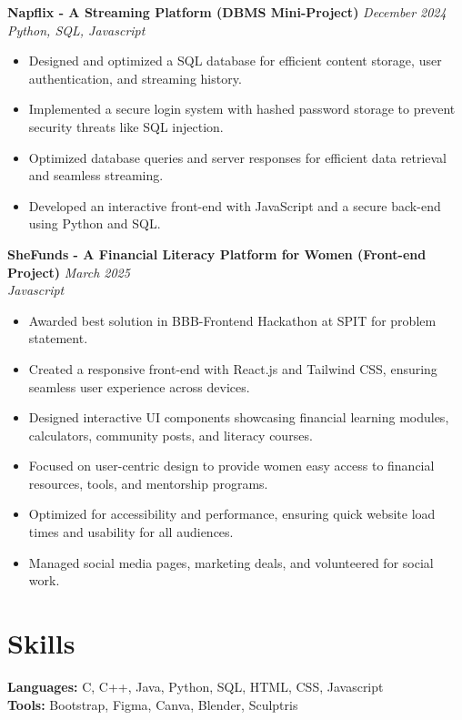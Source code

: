 \documentclass{article}
\begin{document}
\textbf{Napflix - A Streaming Platform (DBMS Mini-Project)} \hfill \textit{December 2024} \\
\textit{Python, SQL, Javascript} \\
\begin{itemize}
    \item Designed and optimized a SQL database for efficient content storage, user authentication, and streaming history.
    \item Implemented a secure login system with hashed password storage to prevent security threats like SQL injection.
    \item Optimized database queries and server responses for efficient data retrieval and seamless streaming.
    \item Developed an interactive front-end with JavaScript and a secure back-end using Python and SQL.
\end{itemize}

\textbf{SheFunds - A Financial Literacy Platform for Women (Front-end Project)} \hfill \textit{March 2025} \\
\textit{Javascript} \\
\begin{itemize}
    \item Awarded best solution in BBB-Frontend Hackathon at SPIT for problem statement.
    \item Created a responsive front-end with React.js and Tailwind CSS, ensuring seamless user experience across devices.
    \item Designed interactive UI components showcasing financial learning modules, calculators, community posts, and literacy courses.
    \item Focused on user-centric design to provide women easy access to financial resources, tools, and mentorship programs.
    \item Optimized for accessibility and performance, ensuring quick website load times and usability for all audiences.
    \item Managed social media pages, marketing deals, and volunteered for social work.
\end{itemize}

\section*{Skills}
\textbf{Languages:} C, C++, Java, Python, SQL, HTML, CSS, Javascript \\
\textbf{Tools:} Bootstrap, Figma, Canva, Blender, Sculptris
\end{document}
